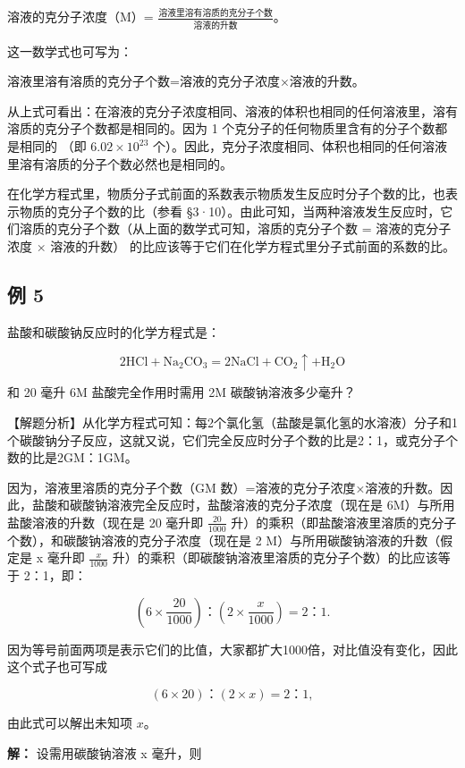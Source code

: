 溶液的克分子浓度（M）=
\(\frac{\text{溶液里溶有溶质的克分子个数}}{\text{溶液的升数}}\)。

这一数学式也可写为：

溶液里溶有溶质的克分子个数=溶液的克分子浓度×溶液的升数。

从上式可看出：在溶液的克分子浓度相同、溶液的体积也相同的任何溶液里，溶有溶质的克分子个数都是相同的。因为
1 个克分子的任何物质里含有的分子个数都是相同的 （即
\(6.02 \times 10^{23}\)
个）。因此，克分子浓度相同、体积也相同的任何溶液里溶有溶质的分子个数必然也是相同的。

在化学方程式里，物质分子式前面的系数表示物质发生反应时分子个数的比，也表示物质的克分子个数的比（参看
§3·10）。由此可知，当两种溶液发生反应时，它们溶质的克分子个数（从上面的数学式可知，溶质的克分子个数
= 溶液的克分子浓度 × 溶液的升数）
的比应该等于它们在化学方程式里分子式前面的系数的比。

\subsection{例 5}

盐酸和碳酸钠反应时的化学方程式是：

\[
2 \mathrm{HCl} + \mathrm{Na}_{2} \mathrm{CO}_{3} = 2 \mathrm{NaCl} + \mathrm{CO}_{2} \uparrow + \mathrm{H}_{2} \mathrm{O}
\]

和 20 毫升 6M 盐酸完全作用时需用 2M 碳酸钠溶液多少毫升？

【解题分析】从化学方程式可知：每2个氯化氢（盐酸是氯化氢的水溶液）分子和1个碳酸钠分子反应，这就又说，它们完全反应时分子个数的比是2：1，或克分子个数的比是2GM：1GM。

因为，溶液里溶质的克分子个数（GM
数）=溶液的克分子浓度×溶液的升数。因此，盐酸和碳酸钠溶液完全反应时，盐酸溶液的克分子浓度（现在是
6M）与所用盐酸溶液的升数（现在是 20 毫升即 \(\frac{20}{1000}\)
升）的乘积（即盐酸溶液里溶质的克分子个数），和碳酸钠溶液的克分子浓度（现在是
2 M）与所用碳酸钠溶液的升数（假定是 x 毫升即 \(\frac{x}{1000}\)
升）的乘积（即碳酸钠溶液里溶质的克分子个数）的比应该等于 2：1，即：

\[
\left(6 \times \frac {20}{1000}\right)\text{：} \left(2 \times \frac {x}{1000}\right) = 2\text{：} 1.
\]

因为等号前面两项是表示它们的比值，大家都扩大1000倍，对比值没有变化，因此这个式子也可写成

\[
(6 \times 20)\text{：} (2 \times x) = 2\text{：} 1,
\]

由此式可以解出未知项 \(x\)。

\textbf{解：} 设需用碳酸钠溶液 x 毫升，则

